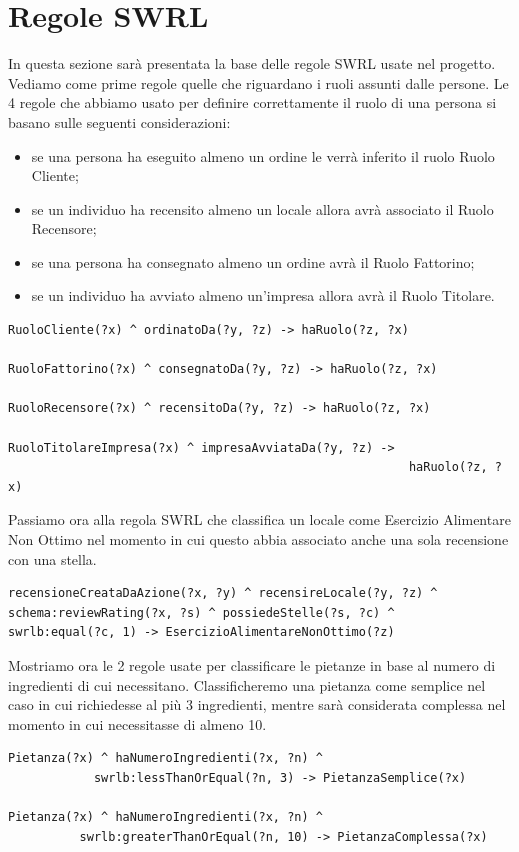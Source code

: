 \documentclass[12pt]{article}
\begin{document}
\section{Regole SWRL}
In questa sezione sarà presentata la base delle regole SWRL usate nel progetto. Vediamo come prime regole quelle che riguardano i ruoli assunti dalle persone. Le 4 regole che abbiamo usato per definire correttamente il ruolo di una persona si basano sulle seguenti considerazioni:
\begin{itemize}
    \item se una persona ha eseguito almeno un ordine le verrà inferito il ruolo Ruolo Cliente;
    \item se un individuo ha recensito almeno un locale allora avrà associato il Ruolo Recensore;
    \item se una persona ha consegnato almeno un ordine avrà il Ruolo Fattorino;
    \item se un individuo ha avviato almeno un'impresa allora avrà il Ruolo Titolare.
\end{itemize}
\begin{lstlisting}[language=SPARQL]
RuoloCliente(?x) ^ ordinatoDa(?y, ?z) -> haRuolo(?z, ?x)
    
RuoloFattorino(?x) ^ consegnatoDa(?y, ?z) -> haRuolo(?z, ?x)
    
RuoloRecensore(?x) ^ recensitoDa(?y, ?z) -> haRuolo(?z, ?x)
    
RuoloTitolareImpresa(?x) ^ impresaAvviataDa(?y, ?z) -> 
                                                        haRuolo(?z, ?x)
\end{lstlisting}
Passiamo ora alla regola SWRL che classifica un locale come Esercizio Alimentare Non Ottimo nel momento in cui questo abbia associato anche una sola recensione con una stella.
\begin{lstlisting}[language=SPARQL]
recensioneCreataDaAzione(?x, ?y) ^ recensireLocale(?y, ?z) ^
schema:reviewRating(?x, ?s) ^ possiedeStelle(?s, ?c) ^
swrlb:equal(?c, 1) -> EsercizioAlimentareNonOttimo(?z)
\end{lstlisting}
Mostriamo ora le 2 regole usate per classificare le pietanze in base al numero di ingredienti di cui necessitano. Classificheremo una pietanza come semplice nel caso in cui richiedesse al più 3 ingredienti, mentre sarà considerata complessa nel momento in cui necessitasse di almeno 10.
\begin{lstlisting}[language=SPARQL]
Pietanza(?x) ^ haNumeroIngredienti(?x, ?n) ^ 
            swrlb:lessThanOrEqual(?n, 3) -> PietanzaSemplice(?x)
    
Pietanza(?x) ^ haNumeroIngredienti(?x, ?n) ^ 
          swrlb:greaterThanOrEqual(?n, 10) -> PietanzaComplessa(?x)
\end{lstlisting}
\end{document}
